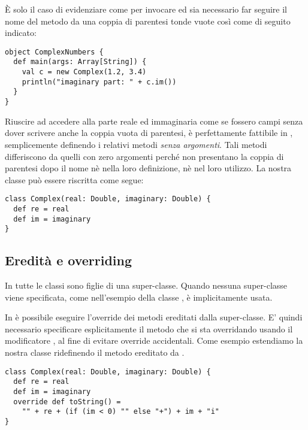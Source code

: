 \`E solo il caso di evidenziare come per invocare  ed  sia necessario far seguire il nome del metodo da una coppia di parentesi tonde vuote cos\`i come di seguito indicato:
\begin{lstlisting}[escapechar=\#]
object ComplexNumbers {
  def main(args: Array[String]) {
    val c = new Complex(1.2, 3.4)
    println("imaginary part: " + c.im())
  }
}
\end{lstlisting}
Riuscire ad accedere alla parte reale ed immaginaria come se fossero campi senza dover scrivere anche la coppia vuota di parentesi,  \`e perfettamente fattibile in \Scala, semplicemente definendo i relativi metodi \emph{senza argomenti}. Tali metodi differiscono da quelli con zero argomenti perch\'e non presentano la coppia di parentesi dopo il nome n\`e nella loro definizione, n\`e nel loro utilizzo. La nostra classe  pu\`o essere riscritta come segue:
\begin{lstlisting}
class Complex(real: Double, imaginary: Double) {
  def re = real
  def im = imaginary
}
\end{lstlisting}
	
\subsection{Eredit\`a   e overriding}
\label{sec:inheritance}

In \Scala tutte le classi sono figlie di una super-classe. Quando nessuna super-classe viene specificata, come nell'esempio della classe ,  \`e implicitamente usata.

In \Scala \`e possibile eseguire l'override dei metodi ereditati dalla super-classe. E' quindi necessario specificare esplicitamente il metodo che si sta overridando usando il modificatore , al fine di evitare override accidentali. Come esempio estendiamo la nostra classe  ridefinendo il metodo  ereditato da .
\begin{lstlisting}
class Complex(real: Double, imaginary: Double) {
  def re = real
  def im = imaginary
  override def toString() =
    "" + re + (if (im < 0) "" else "+") + im + "i"
}
\end{lstlisting}